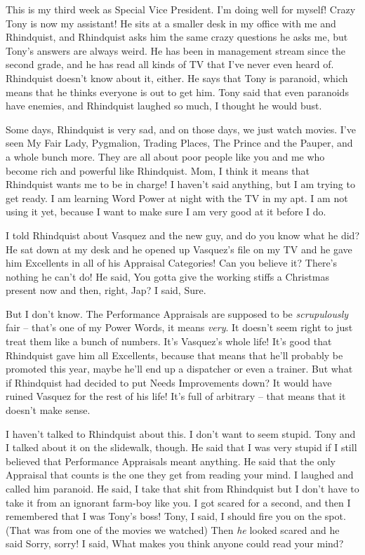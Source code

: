This is my third week as Special Vice President. I'm doing well for 
myself! Crazy Tony is now my assistant! He sits at a smaller desk in my 
office with me and Rhindquist, and Rhindquist asks him the same crazy 
questions he asks me, but Tony's answers are always weird. He has been 
in management stream since the second grade, and he has read all kinds 
of TV that I've never even heard of. Rhindquist doesn't know about it, 
either. He says that Tony is paranoid, which means that he thinks 
everyone is out to get him. Tony said that even paranoids have enemies, 
and Rhindquist laughed so much, I thought he would bust.

Some days, Rhindquist is very sad, and on those days, we just watch 
movies. I've seen My Fair Lady, Pygmalion, Trading Places, The Prince 
and the Pauper, and a whole bunch more. They are all about poor people 
like you and me who become rich and powerful like Rhindquist. Mom, I 
think it means that Rhindquist wants me to be in charge! I haven't said 
anything, but I am trying to get ready. I am learning Word Power at 
night with the TV in my apt. I am not using it yet, because I want to 
make sure I am very good at it before I do.

I told Rhindquist about Vasquez and the new guy, and do you know what 
he did? He sat down at my desk and he opened up Vasquez's file on my TV 
and he gave him Excellents in all of his Appraisal Categories! Can you 
believe it? There's nothing he can't do! He said, You gotta give the 
working stiffs a Christmas present now and then, right, Jap? I said, 
Sure.

But I don't know. The Performance Appraisals are supposed to be 
\emph{scrupulously} fair -- that's one of my Power Words, it means 
\emph{very}. It doesn't seem right to just treat them like a bunch of 
numbers. It's Vasquez's whole life! It's good that Rhindquist gave him 
all Excellents, because that means that he'll probably be promoted this 
year, maybe he'll end up a dispatcher or even a trainer. But what if 
Rhindquist had decided to put Needs Improvements down? It would have 
ruined Vasquez for the rest of his life! It's full of arbitrary -- that 
means that it doesn't make sense.

I haven't talked to Rhindquist about this. I don't want to seem stupid. 
Tony and I talked about it on the slidewalk, though. He said that I was 
very stupid if I still believed that Performance Appraisals meant 
anything. He said that the only Appraisal that counts is the one they 
get from reading your mind. I laughed and called him paranoid. He said, 
I take that shit from Rhindquist but I don't have to take it from an 
ignorant farm-boy like you. I got scared for a second, and then I 
remembered that I was Tony's boss! Tony, I said, I should fire you on 
the spot. (That was from one of the movies we watched) Then \emph{he} 
looked scared and he said Sorry, sorry! I said, What makes you think 
anyone could read your mind?

